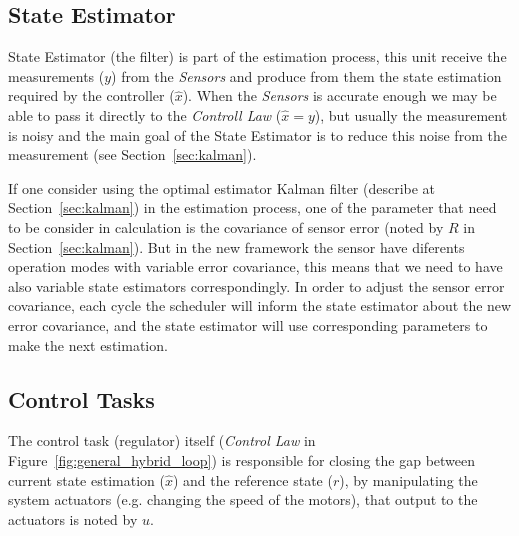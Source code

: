 \documentclass[ twoside, 12pt ]{article}
\begin{document}
{\subsection{State Estimator}
\label{sec:estimator}

State Estimator (the filter) is part of the estimation process, this unit receive the measurements ($y$) from the \textit{Sensors} and produce from them the state estimation required by the controller ($\hat{x}$).
When the \textit{Sensors} is accurate enough we may be able to pass it directly to the \textit{Controll Law} ($\hat{x} = y$), but usually the measurement is noisy and the main goal of the State Estimator is to reduce this noise from the measurement (see Section~\ref{sec:kalman}).

If one consider using the optimal estimator Kalman filter (describe at Section~\ref{sec:kalman}) in the estimation process, one of the parameter that need to be consider in calculation is the covariance of sensor error (noted by $R$ in Section~\ref{sec:kalman}).
But in the new framework the sensor have diferents operation modes with variable error covariance, this means that we need to have also variable state estimators correspondingly.
In order to adjust the sensor error covariance, each cycle the scheduler will inform the state estimator about the new error covariance, and the state estimator will use corresponding parameters to make the next estimation.

\subsection{Control Tasks} 
\label{sec:control} 
The control task (regulator) itself (\textit{Control Law} in Figure~\ref{fig:general_hybrid_loop}) is responsible for closing the gap between current state estimation ($\hat{x}$) and the reference state ($r$), by manipulating the system actuators (e.g. changing the speed of the motors), that output to the actuators is noted by $u$.

}
\end{document}
